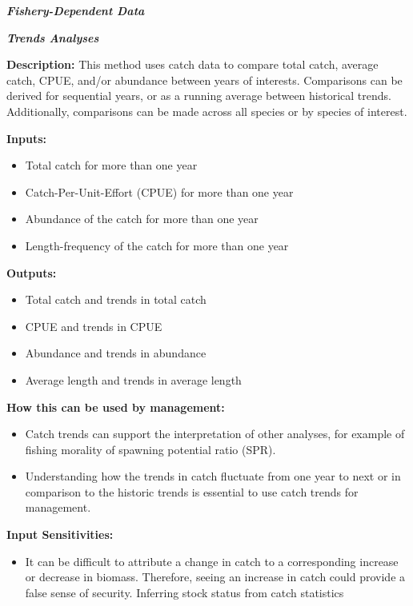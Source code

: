 \documentclass[]{book}
\providecommand{\tightlist}{%
  \setlength{\itemsep}{0pt}\setlength{\parskip}{0pt}}
\begin{document}
\textbf{\emph{Fishery-Dependent Data}}

\textbf{\emph{Trends Analyses}}

\textbf{Description:} This method uses catch data to compare total
catch, average catch, CPUE, and/or abundance between years of interests.
Comparisons can be derived for sequential years, or as a running average
between historical trends. Additionally, comparisons can be made across
all species or by species of interest.

\textbf{Inputs:}

\begin{itemize}
\item
  Total catch for more than one year
\item
  Catch-Per-Unit-Effort (CPUE) for more than one year
\item
  Abundance of the catch for more than one year
\item
  Length-frequency of the catch for more than one year
\end{itemize}

\textbf{Outputs:}

\begin{itemize}
\item
  Total catch and trends in total catch
\item
  CPUE and trends in CPUE
\item
  Abundance and trends in abundance
\item
  Average length and trends in average length
\end{itemize}

\textbf{How this can be used by management:}

\begin{itemize}
\item
  Catch trends can support the interpretation of other analyses, for
  example of fishing morality of spawning potential ratio (SPR).
\item
  Understanding how the trends in catch fluctuate from one year to next
  or in comparison to the historic trends is essential to use catch
  trends for management.
\end{itemize}

\textbf{Input Sensitivities:}

\begin{itemize}
\tightlist
\item
  It can be difficult to attribute a change in catch to a corresponding
  increase or decrease in biomass. Therefore, seeing an increase in
  catch could provide a false sense of security. Inferring stock status
  from catch statistics
\end{itemize}
\end{document}
